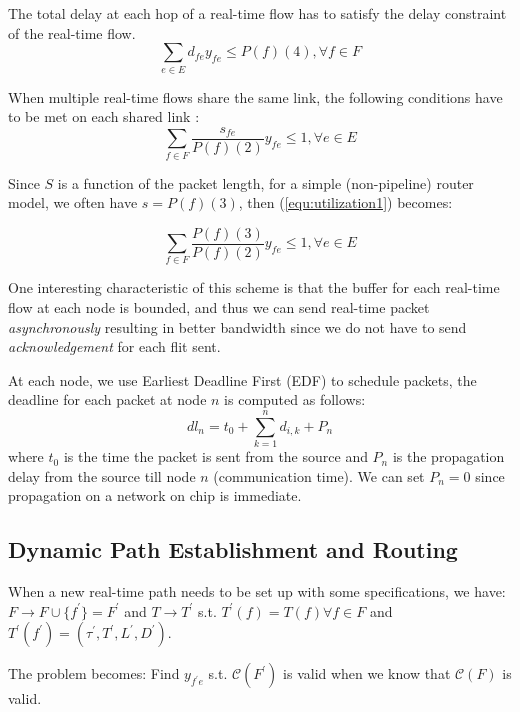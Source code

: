 \documentclass[10pt]{article}
\begin{document}
The total delay at each hop of a real-time flow has to satisfy the delay constraint
of the real-time flow.
\begin{equation}\label{pathdelay1}
\sum_{e \in E}d_{fe}y_{fe} \leq P(f)(4), \forall f \in F
\end{equation}

When multiple real-time flows share the same link, the following conditions
 have to be met on each shared link \cite{Ferrari90ascheme, Verma_inproceedings}:
\begin{equation}\label{equ:utilization1}
\sum_{f \in F}\frac{s_{fe}}{P(f)(2)}y_{fe} \leq 1, \forall e \in E
\end{equation}

Since $S$ is a function of the packet length, for a simple (non-pipeline) router
model, we often have $s=P(f)(3)$, then (\ref{equ:utilization1}) becomes:

\begin{equation}\label{equ:utilization2}
\sum_{f \in F}\frac{P(f)(3)}{P(f)(2)}y_{fe} \leq 1, \forall e \in E
\end{equation}

One interesting characteristic of this scheme is that the buffer for each 
real-time flow at each node is bounded, and thus we can send real-time packet 
{\em asynchronously} resulting in better bandwidth since we do not have to 
send {\em acknowledgement} for each flit sent.

At each node, we use Earliest Deadline First (EDF) \cite{Verma_inproceedings} 
to schedule packets, the deadline for each packet at node $n$ is computed as 
follows: 
\begin{equation}\label{deadline1}
dl_n=t_0 + \sum_{k=1}^{n}d_{i,k}+P_n
\end{equation}
where $t_0$ is the time the packet is sent from the source and $P_n$ is the propagation
delay from the source till node $n$ (communication time). We can set $P_n=0$ since
propagation on a network on chip is immediate.


\subsection{Dynamic Path Establishment and Routing}
When a new real-time path needs to be set up with some specifications, we have:
$F \rightarrow F \cup \{f^{'} \}=F^{'}$
and $T \rightarrow T^{'}$ s.t. $T^{'} (f)=T(f)\forall f \in F$ and $T^{'} (f^{'} )=(\tau ^{'}, T^{'}, L^{'}, D^{'})$.

The problem becomes: Find $y_{f^{'}e}$ s.t. $\mathcal{C}(F^{'})$ is valid
when we know that $\mathcal{C}(F)$ is valid.
\end{document}
